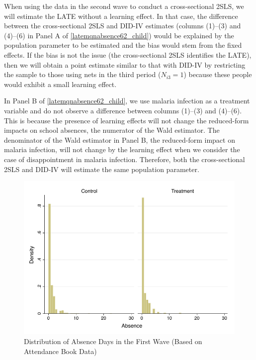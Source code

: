 \documentclass[fleqn,11pt]{article}
\begin{document}
When using the data in the second wave to conduct a cross-sectional 2SLS, we will estimate the LATE without a learning effect. In that case,  the difference between the cross-sectional 2SLS and DID-IV estimates (columns (1)--(3) and (4)--(6) in Panel A of  \autoref{latemqnabsence62_child}) would be explained by the population parameter to be estimated and the bias would stem from the fixed effects. 
If the bias is not the issue (the cross-sectional 2SLS identifies the LATE), then we will obtain a point estimate similar to that with DID-IV by restricting the sample to those using nets in the third period ($N_{i3}=1$) because these people would exhibit a small learning effect.

In Panel B of  \autoref{latemqnabsence62_child}, we use malaria infection as a treatment variable and do not observe a difference between columns (1)--(3) and (4)--(6). This is because the presence of learning effects will not change the reduced-form impacts on school absences, the numerator of the Wald estimator. The denominator of the Wald estimator in Panel B, the reduced-form impact on malaria infection, will not change by the learning effect when we consider the case of disappointment in malaria infection. Therefore, both the cross-sectional 2SLS and DID-IV will estimate the same population parameter.



\begin{figure}[h]
\centering
\includegraphics[scale=0.8]{schoolabsence_balance.pdf}
\caption{Distribution of Absence Days in the First Wave (Based on Attendance Book Data)}
\label{f:schoolabsence_balance}

\end{figure}
\end{document}
